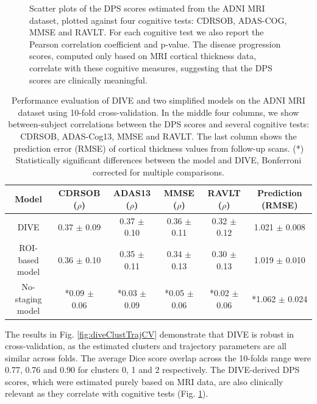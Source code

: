 \begin{figure}[h]
\begin{subfigure}{0.245\textwidth}
  \end{subfigure}
  \caption[Scatter plot of DIVE-derived DPS scores vs cognitive tests]{Scatter plots of the DPS scores estimated from the ADNI MRI dataset, plotted against four cognitive tests: CDRSOB, ADAS-COG, MMSE and RAVLT. For each cognitive test we also report the Pearson correlation coefficient and p-value. The disease progression scores, computed only based on MRI cortical thickness data, correlate with these cognitive measures, suggesting that the DPS scores are clinically meaningful. }
  \label{fig:diveCogCorr}
\end{figure}



\begin{table}[H]
\centering
\begin{footnotesize}
 \begin{tabular}{c | c c c c | c}
  Model & CDRSOB ($\rho$) & ADAS13 ($\rho$) & MMSE ($\rho$) & RAVLT ($\rho$) & Prediction (RMSE)\\
  \hline 
DIVE & 0.37 $\pm$ 0.09 & 0.37 $\pm$ 0.10 & 0.36 $\pm$ 0.11 & 0.32 $\pm$ 0.12 & 1.021 $\pm$ 0.008 \\
ROI-based model & 0.36 $\pm$ 0.10 & 0.35 $\pm$ 0.11 & 0.34 $\pm$ 0.13 & 0.30 $\pm$ 0.13 & 1.019 $\pm$ 0.010 \\
No-staging model & *0.09 $\pm$ 0.06 & *0.03 $\pm$ 0.09 & *0.05 $\pm$ 0.06 & *0.02 $\pm$ 0.06 & *1.062 $\pm$ 0.024 \\

 \end{tabular}
 \end{footnotesize}
 \caption[Performance evaluation of DIVE and two simplified models on the ADNI MRI dataset]{Performance evaluation of DIVE and two simplified models on the ADNI MRI dataset using 10-fold cross-validation. In the middle four columns, we show between-subject correlations between the DPS scores and several cognitive tests: CDRSOB, ADAS-Cog13, MMSE and RAVLT. The last column shows the prediction error (RMSE) of cortical thickness values from follow-up scans. (*) Statistically significant differences between the model and DIVE, Bonferroni corrected for multiple comparisons.}
 \label{tab:divePerfEval}
\end{table}

The results in Fig. \ref{fig:diveClustTrajCV} demonstrate that DIVE is robust in cross-validation, as the estimated clusters and trajectory parameters are all similar across folds. The average Dice score overlap across the 10-folds range were 0.77, 0.76 and 0.90 for clusters 0, 1 and 2 respectively. The DIVE-derived DPS scores, which were estimated purely based on MRI data, are also clinically relevant as they correlate with cognitive tests (Fig. \ref{fig:diveCogCorr}). 

